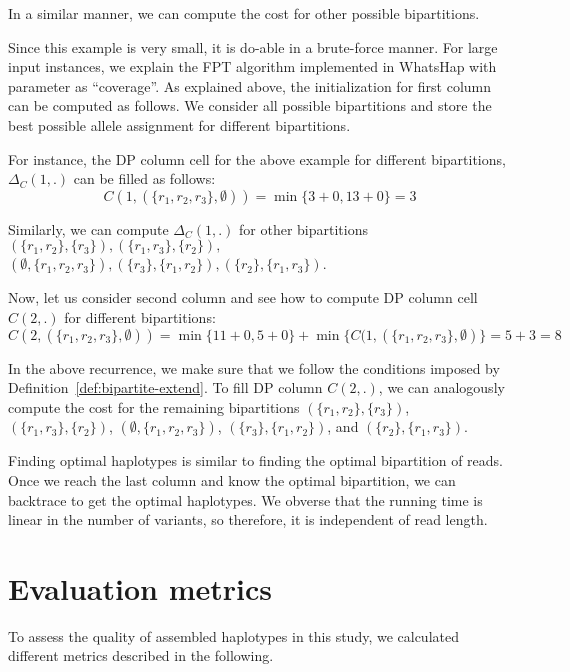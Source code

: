 In a similar manner, we can compute the cost for other possible bipartitions.

Since this example is very small, it is do-able in a brute-force manner. For large input instances, we explain the FPT algorithm implemented in WhatsHap with parameter as ``coverage''.
As explained above, the initialization for first column can be computed as follows. We consider all possible bipartitions and store the best possible allele assignment for different bipartitions.

For instance, the DP column cell for the above example for different bipartitions, $\Delta_C(1,.)$ can be filled as follows:
\[C(1, (\{r_1,r_2,r_3\},\emptyset)) =\min\{3+0,13+0\} = 3\]

Similarly, we can compute $\Delta_C(1,.)$ for other bipartitions $(\{r_1,r_2\},\{r_3\}),(\{r_1,r_3\},\{r_2\}),$\\
$(\emptyset,\{r_1,r_2,r_3\}), (\{r_3\},\{r_1,r_2\}), (\{r_2\},\{r_1,r_3\})$.

Now, let us consider second column and see how to compute DP column cell $C(2,.)$ for different bipartitions:
\[C(2, (\{r_1,r_2,r_3\},\emptyset)) = \min\{11+0, 5+0\}  + \min\{C(1, (\{r_1,r_2,r_3\},\emptyset)\} = 5+3 = 8 \]

In the above recurrence, we make sure that we follow the conditions imposed by Definition~\ref{def:bipartite-extend}.
To fill DP column $C(2,.)$, we can analogously compute the cost for the remaining bipartitions $(\{r_1,r_2\},\{r_3\})$,
$(\{r_1,r_3\},\{r_2\})$, $(\emptyset,\{r_1,r_2,r_3\})$, $(\{r_3\},\{r_1,r_2\})$, and $(\{r_2\},\{r_1,r_3\})$.

Finding optimal haplotypes is similar to finding the optimal bipartition of reads. Once we reach the last column and know the optimal bipartition, we can backtrace to get the optimal haplotypes.
We obverse that the running time is linear in the number of variants, so therefore, it is independent of read length.

\section{Evaluation metrics}
To assess the quality of assembled haplotypes in this study, we calculated different metrics described in the following.

